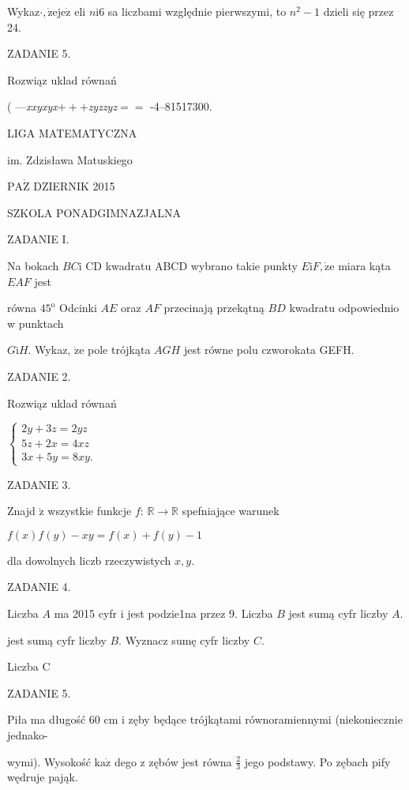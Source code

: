 \documentclass[a4paper,12pt]{article}
\begin{document}
Wykaz$\cdot, \dot{\mathrm{z}}\mathrm{e}\mathrm{j}\mathrm{e}\dot{\mathrm{z}}$ eli $n\mathrm{i}6$ sa liczbami względnie pierwszymi, to $n^{2}-1$ dzieli się przez 24.

ZADANIE 5.

Rozwiąz uklad równań

( ---{\it xxyxyx}$+++${\it zyzzyz}$==$ -4--81517300.






LIGA MATEMATYCZNA

im. Zdzisława Matuskiego

$\mathrm{P}\mathrm{A}\dot{\mathrm{Z}}$ DZIERNIK 2015

SZKOLA PONADGIMNAZJALNA

ZADANIE I.

Na bokach $BC\mathrm{i}$ CD kwadratu ABCD wybrano takie punkty $E\mathrm{i}F, \dot{\mathrm{z}}\mathrm{e}$ miara kąta $EAF$ jest

równa $45^{\mathrm{o}}$ Odcinki $AE$ oraz $AF$ przecinają przekątną $BD$ kwadratu odpowiednio w punktach

$G\mathrm{i}H$. Wykaz, $\dot{\mathrm{z}}\mathrm{e}$ pole trójkąta $AGH$ jest równe polu czworokata GEFH.

ZADANIE 2.

Rozwiąz uklad równań

$\left\{\begin{array}{l}
2y+3z=2yz\\
5z+2x=4xz\\
3x+5y=8xy.
\end{array}\right.$

ZADANIE 3.

Znajd $\acute{\mathrm{z}}$ wszystkie funkcje $f$: $\mathbb{R}\rightarrow \mathbb{R}$ spefniające warunek

$f(x)f(y)-xy=f(x)+f(y)-1$

dla dowolnych liczb rzeczywistych $x, y.$

ZADANIE 4.

Liczba $A$ ma 2015 cyfr i jest podzie1na przez 9. Liczba $B$ jest sumą cyfr liczby $A.$

jest sumą cyfr liczby $B$. Wyznacz sumę cyfr liczby $C.$

Liczba C

ZADANIE 5.

Piła ma długość 60 cm i zęby będące trójkątami równoramiennymi (niekoniecznie jednako-

wymi). Wysokość $\mathrm{k}\mathrm{a}\dot{\mathrm{z}}$ dego z zębów jest równa $\displaystyle \frac{2}{3}$ jego podstawy. Po zębach pify wędruje pająk.
\end{document}
